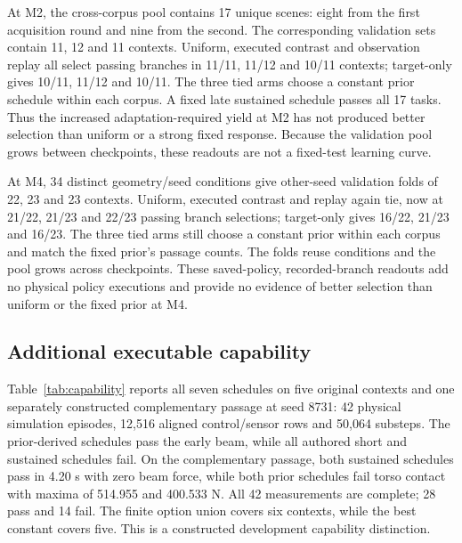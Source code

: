 \documentclass[10pt]{article}
\begin{document}
At M2, the cross-corpus pool contains 17 unique scenes: eight from the first
acquisition round and nine from the second. The corresponding validation sets
contain 11, 12 and 11 contexts. Uniform, executed contrast and observation replay
all select passing branches in 11/11, 11/12 and 10/11 contexts; target-only gives
10/11, 11/12 and 10/11. The three tied arms choose a constant prior schedule
within each corpus. A fixed late sustained schedule passes all 17 tasks.
Thus the increased adaptation-required yield at M2 has not produced better
selection than uniform or a strong fixed response. Because the validation pool
grows between checkpoints, these readouts are not a fixed-test learning curve.

At M4, 34 distinct geometry/seed conditions give other-seed validation folds of
22, 23 and 23 contexts. Uniform, executed contrast and replay again tie, now at
21/22, 21/23 and 22/23 passing branch selections; target-only gives 16/22, 21/23
and 16/23. The three tied arms still choose a constant prior within each corpus
and match the fixed prior's passage counts. The folds reuse conditions and the
pool grows across checkpoints. These saved-policy, recorded-branch readouts add
no physical policy executions and provide no evidence of better selection than
uniform or the fixed prior at M4.

\subsection{Additional executable capability}
Table~\ref{tab:capability} reports all seven schedules on five original contexts
and one separately constructed complementary passage at seed 8731: 42 physical
simulation episodes, 12,516 aligned control/sensor rows and 50,064 substeps.
The prior-derived schedules pass the early beam, while all authored short and
sustained schedules fail. On the complementary passage, both sustained schedules
pass in 4.20 s with zero beam force, while both prior schedules fail torso contact
with maxima of 514.955 and 400.533 N. All 42 measurements are complete; 28 pass
and 14 fail. The finite option union covers six contexts, while the best constant
covers five. This is a constructed development capability distinction.
\end{document}
